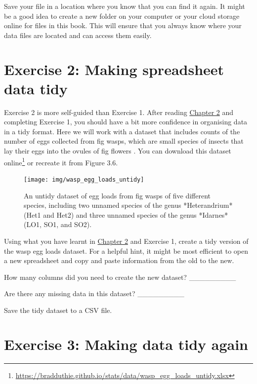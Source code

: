 \documentclass[
]{scrbook}
\begin{document}
Save your file in a location where you know that you can find it again.
It might be a good idea to create a new folder on your computer or your cloud storage online for files in this book.
This will ensure that you always know where your data files are located and can access them easily.

\hypertarget{exercise-2-making-spreadsheet-data-tidy}{%
\section{Exercise 2: Making spreadsheet data tidy}\label{exercise-2-making-spreadsheet-data-tidy}}

Exercise 2 is more self-guided than Exercise 1.
After reading \protect\hyperlink{Chapter_2}{Chapter 2} and completing Exercise 1, you should have a bit more confidence in organising data in a tidy format.
Here we will work with a dataset that includes counts of the number of eggs collected from fig wasps, which are small species of insects that lay their eggs into the ovules of fig flowers \citep{Weiblen2002}.
You can download this dataset online\footnote{\url{https://bradduthie.github.io/stats/data/wasp_egg_loads_untidy.xlsx}} or recreate it from Figure 3.6.

\begin{figure}
\texttt{[image: img/wasp\_egg\_loads\_untidy]} \caption{An untidy dataset of egg loads from fig wasps of five different species, including two unnamed species of the genus *Heterandrium* (Het1 and Het2) and three unnamed species of the genus *Idarnes* (LO1, SO1, and SO2).}\label{fig:unnamed-chunk-15}
\end{figure}

Using what you have learnt in \protect\hyperlink{Chapter_2}{Chapter 2} and Exercise 1, create a tidy version of the wasp egg loads dataset.
For a helpful hint, it might be most efficient to open a new spreadsheet and copy and paste information from the old to the new.

How many columns did you need to create the new dataset? \_\_\_\_\_\_\_\_\_

Are there any missing data in this dataset? \_\_\_\_\_\_\_\_\_

Save the tidy dataset to a CSV file.

\hypertarget{exercise-3-making-data-tidy-again}{%
\section{Exercise 3: Making data tidy again}\label{exercise-3-making-data-tidy-again}}
\end{document}
